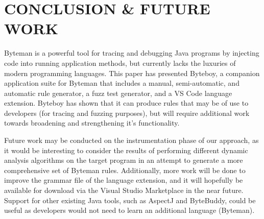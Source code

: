 \documentclass[letterpaper,twocolumn,10pt]{article}
\begin{document}
\section{CONCLUSION \& FUTURE WORK}

Byteman is a powerful tool for tracing and debugging Java programs by injecting code into running application methods, but currently lacks the luxuries of modern programming languages. This paper has presented Byteboy, a companion application suite for Byteman that includes a manual, semi-automatic, and automatic rule generator, a fuzz test generator, and a VS Code language extension. Byteboy has shown that it can produce rules that may be of use to developers (for tracing and fuzzing purposes), but will require additional work towards broadening and strengthening it's functionality.

Future work may be conducted on the instrumentation phase of our approach, as it would be interesting to consider the results of performing different dynamic analysis algorithms on the target program in an attempt to generate a more comprehensive set of Byteman rules. Additionally, more work will be done to improve the grammar file of the language extension, and it will hopefully be available for download via the Visual Studio Marketplace in the near future. Support for other existing Java tools, such as AspectJ and ByteBuddy, could be useful as developers would not need to learn an additional language (Byteman).  
\end{document}
